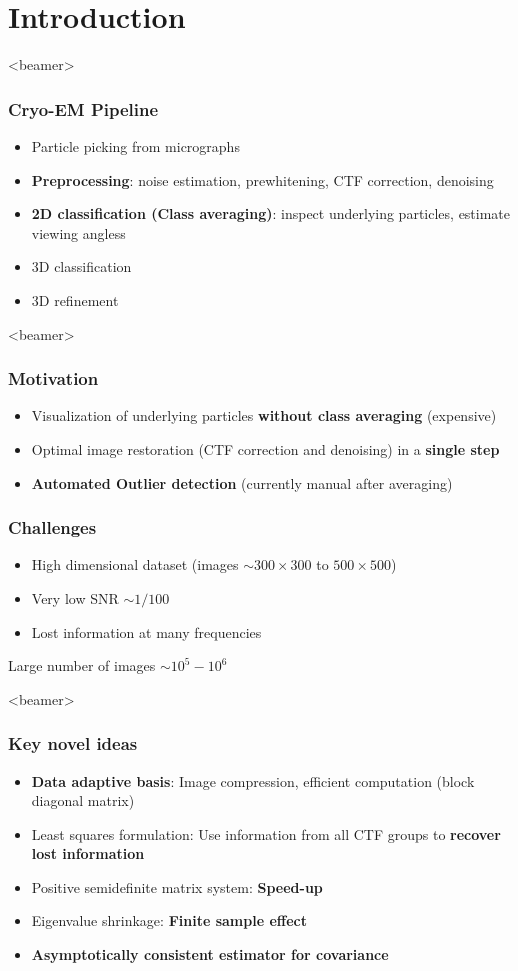 \documentclass{beamer}
\begin{document}
\section{Introduction}
\begin{frame}<beamer>
\frametitle{Cryo-EM Pipeline}
\begin{itemize}
 \item Particle picking from micrographs
 \item \textbf{Preprocessing}: noise estimation, prewhitening, CTF correction, denoising
 \item \textbf{2D classification (Class averaging)}: inspect underlying particles, estimate viewing angless
 \item 3D classification
 \item 3D refinement
\end{itemize}
\end{frame}

\begin{frame}<beamer>
\frametitle{Motivation}
\begin{itemize}
 \item Visualization of underlying particles \textbf{without class averaging} (expensive)
 \item Optimal image restoration (CTF correction and denoising) in a \textbf{single step}
  \item \textbf{Automated Outlier detection} (currently manual after averaging)
\end{itemize}
\end{frame}

\begin{frame}
\frametitle{Challenges}
\begin{itemize}
 \item High dimensional dataset (images $\sim 300 \times 300$ to $500 \times 500$)
 \item Very low SNR $\sim 1/100$
 \item Lost information at many frequencies
\end{itemize}
Large number of images $\sim 10^5 - 10^6$
\end{frame}

\begin{frame}<beamer>
\frametitle{Key novel ideas}
\begin{itemize}
 \item \textbf{Data adaptive basis}: Image compression, efficient computation (block diagonal matrix)
 \item Least squares formulation: Use information from all CTF groups to \textbf{recover lost information}
 \item Positive semidefinite matrix system: \textbf{Speed-up }
 \item Eigenvalue shrinkage: \textbf{Finite sample effect}
 \item \textbf{Asymptotically consistent estimator for covariance}
\end{itemize}
\end{frame}
\end{document}
